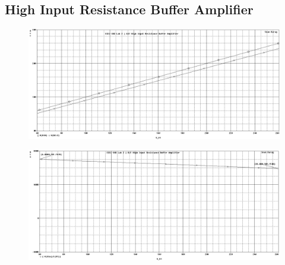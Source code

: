 \subsection{High Input Resistance Buffer Amplifier}
\begin{figure}[H]
	\centering
	\includegraphics[width=\pwidth]{img/plot/bjtPlotV.PNG}
	\parbox{\pwidth}{
	\caption{}
	\label{fig:bjtPlotV}}
\end{figure}

\begin{figure}[H]
	\centering
	\includegraphics[width=\pwidth]{img/plot/bjtPlotR.PNG}
	\parbox{\pwidth}{
	\caption{}
	\label{fig:bjtPlotR}}
\end{figure}


